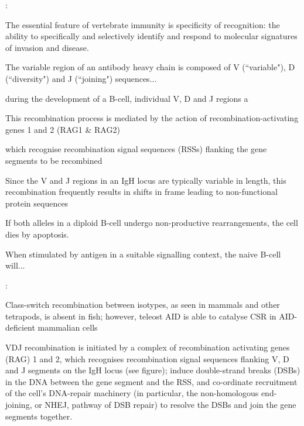 \citep{mix2006immunoglobulins}:

The essential feature  of vertebrate immunity is specificity of recognition: the ability to specifically and selectively identify and respond to molecular signatures of invasion and disease. %

The variable region of an antibody heavy chain is composed of V (``variable"), D (``diversity") and J (``joining") sequences... %

during the development of a B-cell, individual V, D and J regions a

This recombination process is mediated by the action of recombination-activating genes 1 and 2 (RAG1 \& RAG2)%

which recognise recombination signal sequences (RSSs) flanking the gene segments to be recombined %

Since the V and J regions in an IgH locus are typically variable in length, this recombination frequently results in shifts in frame leading to non-functional protein sequences%

If both alleles in a diploid B-cell undergo non-productive rearrangements, the cell dies by apoptosis. 


When stimulated by antigen in a suitable signalling context, the naive B-cell will...



\citep{patel2018aid}:

Class-switch recombination between isotypes, as seen in mammals and other tetrapods, is absent in fish; however, teleost AID is able to catalyse CSR in AID-deficient mammalian cells%

VDJ recombination is initiated by a complex of recombination activating genes (RAG) 1 and 2, which recognises recombination signal sequences flanking V, D and J segments on the IgH locus (see figure); induce double-strand breaks (DSBs) in the DNA between the gene segment and the RSS, and co-ordinate recruitment of the cell's DNA-repair machinery (in particular, the non-homologous end-joining, or NHEJ, pathway of DSB repair) to resolve the DSBs and join the gene segments together. %

